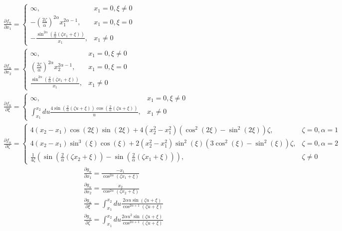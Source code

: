 \documentclass[12pt]{article}
\begin{document}
\begin{subequations}
\begin{align}
&\frac{\partial f_{\alpha}}{\partial x_1} =
	\begin{cases}
	\infty,													& x_1=0, \xi\neq0\\
	-\left(\frac{2\zeta}{\alpha}\right)^{2\alpha}x_1^{2\alpha-1},			& x_1=0, \xi=0\\
	-\frac{\sin^{2\alpha}\left(\frac{2}{\alpha}(\zeta x_1+\xi)\right)}{x_1},	& x_1\neq0
	\end{cases}\label{eq:dfdx_1}\\
&\frac{\partial f_{\alpha}}{\partial x_2} =
	\begin{cases}
	\infty,													& x_1=0, \xi\neq0\\
	\left(\frac{2\zeta}{\alpha}\right)^{2\alpha}x_2^{2\alpha-1},			& x_1=0, \xi=0\\
	\frac{\sin^{2\alpha}\left(\frac{2}{\alpha}(\zeta x_1+\xi)\right)}{x_1},	& x_1\neq0
	\end{cases}\label{eq:dfdx_2}\\
&\frac{\partial f_{\alpha}}{\partial \xi} = 
	\begin{cases}
	\infty,													& x_1 = 0,\xi\neq0\\
	\int_{x_1}^{x_2}du\frac{4\sin\left(\frac{2}{\alpha}(\zeta u+\xi)\right)\cos\left(\frac{2}{\alpha}(\zeta u+\xi)\right)}{u},	& x_1\neq0
	\end{cases}\label{eq:dfdxi}\\
&\frac{\partial f_{\alpha}}{\partial\zeta} = 
	\begin{cases}
	4(x_2-x_1)\cos(2\xi)\sin(2\xi)+4(x_2^2-x_1^2)(\cos^2(2\xi)-\sin^2(2\xi))\zeta,	&\zeta=0,\alpha=1\\
	4(x_2-x_1)\sin^3(\xi)\cos(\xi)+2(x_2^2-x_1^2)\sin^2(\xi)(3\cos^2(\xi)-\sin^2(\xi))\zeta,	&\zeta=0,\alpha=2\\
	\frac{1}{4\zeta}\left(\sin\left(\frac{2}{\alpha}(\zeta x_2+\xi)\right)-\sin\left(\frac{2}{\alpha}(\zeta x_1+\xi)\right)\right),		&\zeta\neq0
	\end{cases}\label{eq:dfdzeta}
\end{align}
\end{subequations}
\begin{subequations}
\begin{align}
&\frac{\partial g_{\alpha}}{\partial x_1}=\frac{-x_1}{\cos^{2\alpha}(\zeta x_1 +\xi)}\label{eq:dgdx_1}\\
&\frac{\partial g_{\alpha}}{\partial x_2}=\frac{x_2}{\cos^{2\alpha}(\zeta x_2+\xi)}\label{eq:dgdx_2}\\
&\frac{\partial g_{\alpha}}{\partial\xi}=\int_{x_1}^{x_2}du\frac{2\alpha u \sin(\zeta u+\xi)}{\cos^{2\alpha+1}(\zeta u+\xi)}\label{eq:dgdxi}\\
&\frac{\partial g_{\alpha}}{\partial\zeta}=\int_{x_1}^{x_2}du\frac{2\alpha u^2\sin(\zeta u+\xi)}{\cos^{2\alpha+1}(\zeta u +\xi)}\label{eq:dgdzeta}
\end{align}
\end{subequations}

	
\clearpage


\end{document}
